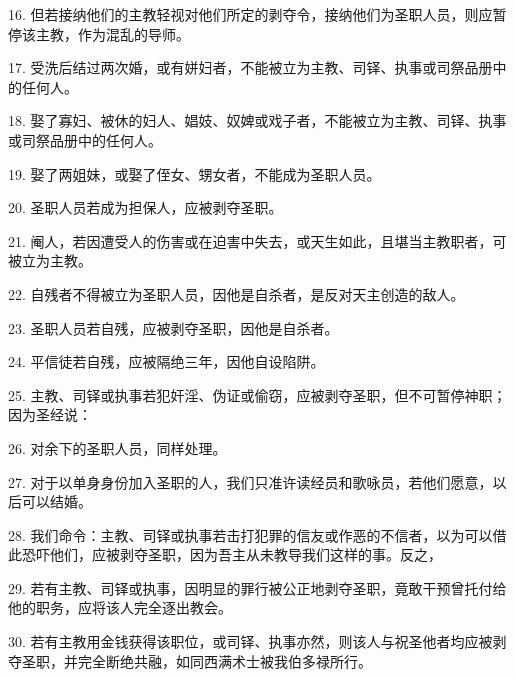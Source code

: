 16. 但若接纳他们的主教轻视对他们所定的剥夺令，接纳他们为圣职人员，则应暂停该主教，作为混乱的导师。\par

17. 受洗后结过两次婚，或有姘妇者，不能被立为主教、司铎、执事或司祭品册中的任何人。\par

18. 娶了寡妇、被休的妇人、娼妓、奴婢或戏子者，不能被立为主教、司铎、执事或司祭品册中的任何人。\par

19. 娶了两姐妹，或娶了侄女、甥女者，不能成为圣职人员。\par

20. 圣职人员若成为担保人，应被剥夺圣职。\par

21. 阉人，若因遭受人的伤害或在迫害中失去，或天生如此，且堪当主教职者，可被立为主教。\par

22. 自残者不得被立为圣职人员，因他是自杀者，是反对天主创造的敌人。\par

23. 圣职人员若自残，应被剥夺圣职，因他是自杀者。\par

24. 平信徒若自残，应被隔绝三年，因他自设陷阱。\par

25. 主教、司铎或执事若犯奸淫、伪证或偷窃，应被剥夺圣职，但不可暂停神职；因为圣经说：\par

26. 对余下的圣职人员，同样处理。\par

27. 对于以单身身份加入圣职的人，我们只准许读经员和歌咏员，若他们愿意，以后可以结婚。\par

28. 我们命令：主教、司铎或执事若击打犯罪的信友或作恶的不信者，以为可以借此恐吓他们，应被剥夺圣职，因为吾主从未教导我们这样的事。反之，\par

29. 若有主教、司铎或执事，因明显的罪行被公正地剥夺圣职，竟敢干预曾托付给他的职务，应将该人完全逐出教会。\par

30. 若有主教用金钱获得该职位，或司铎、执事亦然，则该人与祝圣他者均应被剥夺圣职，并完全断绝共融，如同西满术士被我伯多禄所行。\par


